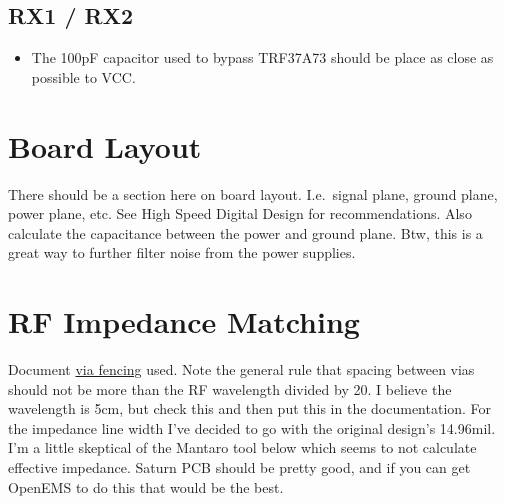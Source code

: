 \documentclass{default}
\begin{document}
\subsection{RX1 / RX2}

\begin{itemize}
\item The 100pF capacitor used to bypass TRF37A73 should be place as close as possible to VCC\@.
\end{itemize}

\section{Board Layout}
\label{sec:board-layout}

There should be a section here on board layout. I.e.\ signal plane, ground plane, power plane,
etc. See High Speed Digital Design for recommendations. Also calculate the capacitance between the
power and ground plane. Btw, this is a great way to further filter noise from the power supplies.


\section{RF Impedance Matching}

Document \href{https://en.wikipedia.org/wiki/Via_fence}{via fencing} used. Note the general rule
that spacing between vias should not be more than the RF wavelength divided by 20. I believe the
wavelength is 5cm, but check this and then put this in the documentation. For the impedance line
width I've decided to go with the original design's 14.96mil. I'm a little skeptical of the Mantaro
tool below which seems to not calculate effective impedance. Saturn PCB should be pretty good, and
if you can get OpenEMS to do this that would be the best.
\end{document}
